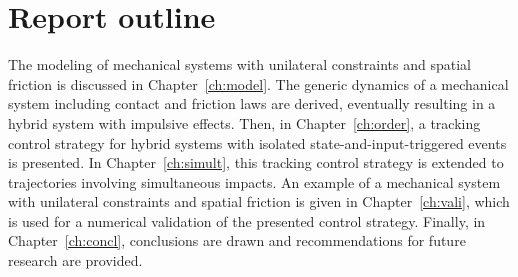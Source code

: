 \documentclass[../DC2019003Bouma.tex]{subfiles}
\begin{document}
\section{Report outline}
The modeling of mechanical systems with unilateral constraints and spatial friction is discussed in Chapter~\ref{ch:model}. The generic dynamics of a mechanical system including contact and friction laws are derived, eventually resulting in a hybrid system with impulsive effects. Then, in Chapter~\ref{ch:order}, a tracking control strategy for hybrid systems with isolated state-and-input-triggered events is presented. In Chapter~\ref{ch:simult}, this tracking control strategy is extended to trajectories involving simultaneous impacts. An example of a mechanical system with unilateral constraints and spatial friction is given in Chapter~\ref{ch:vali}, which is used for a numerical validation of the presented control strategy. Finally, in Chapter~\ref{ch:concl}, conclusions are drawn and recommendations for future research are provided.
\end{document}
